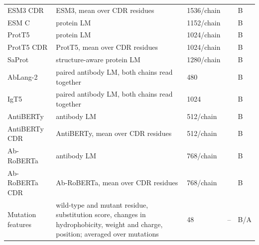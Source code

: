 \begin{longtable}{p{3.2cm}p{5.6cm}p{1.6cm}p{1.6cm}p{1.4cm}}
ESM3 CDR & ESM3, mean over CDR residues & 1536/chain & \citep{Hayes2025} & B \\
ESM C & protein LM & 1152/chain & \citep{Candido2026} & B \\
ProtT5 & protein LM & 1024/chain & \citep{Elnaggar2022} & B \\
ProtT5 CDR & ProtT5, mean over CDR residues & 1024/chain & \citep{Elnaggar2022} & B \\
SaProt & structure-aware protein LM & 1280/chain & \citep{Su2023SaProt} & B \\
AbLang-2 & paired antibody LM, both chains read together & 480 & \citep{Olsen2024} & B \\
IgT5 & paired antibody LM, both chains read together & 1024 & \citep{Kenlay2024IgT5} & B \\
AntiBERTy & antibody LM & 512/chain & \citep{Ruffolo2021AntiBERTy} & B \\
AntiBERTy CDR & AntiBERTy, mean over CDR residues & 512/chain & \citep{Ruffolo2021AntiBERTy} & B \\
Ab-RoBERTa & antibody LM & 768/chain & \citep{Huh2025} & B \\
Ab-RoBERTa CDR & Ab-RoBERTa, mean over CDR residues & 768/chain & \citep{Huh2025} & B \\
Mutation features & wild-type and mutant residue, substitution score, changes in hydrophobicity, weight and charge, position; averaged over mutations & 48 & -- & B/A \\
\end{longtable}

